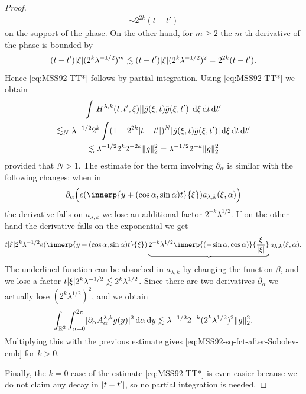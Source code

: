 \begin{proof}
\begin{multline*}
\sim
2^{2k} (t-t')
\end{multline*}
on the support of the phase.
On the other hand, for $m\geq 2$ the $m$-th derivative of the phase is bounded by
\[
(t-t') \lvert\xi\rvert (2^{k}\lambda^{-1/2})^{m}
\lesssim
(t-t') \lvert\xi\rvert (2^{k}\lambda^{-1/2})^{2}
=
2^{2k} (t-t').
\]
Hence \eqref{eq:MSS92-TT*} follows by partial integration.
Using \eqref{eq:MSS92-TT*} we obtain
\begin{multline*}
\int \lvert H^{\lambda,k}(t,t',\xi)\rvert \lvert\tilde{g}(\xi,t) \tilde{g}(\xi,t')\rvert \mathop{}\!\mathrm{d} \xi \mathop{}\!\mathrm{d} t \mathop{}\!\mathrm{d} t'\\
\lesssim_{N}
\lambda^{-1/2}2^{k} \int (1+2^{2k}\lvert t-t'\rvert)^{N} \lvert\tilde{g}(\xi,t) \tilde{g}(\xi,t')\rvert \mathop{}\!\mathrm{d} \xi \mathop{}\!\mathrm{d} t \mathop{}\!\mathrm{d} t'\\
\lesssim
\lambda^{-1/2}2^{k} 2^{-2k} \lVert g\rVert_{2}^{2}
=
\lambda^{-1/2}2^{-k} \lVert g\rVert_{2}^{2}
\end{multline*}
provided that $N>1$.
The estimate for the term involving $\partial_{\alpha}$ is similar with the following changes: when in
\[
\partial_{\alpha} \Bigl( e(\innerp{y+(\cos\alpha,\sin\alpha)t}{\xi}) a_{\lambda,k}(\xi,\alpha) \Bigr)
\]
the derivative falls on $a_{\lambda,k}$ we lose an additional factor $2^{-k}\lambda^{1/2}$.
If on the other hand the derivative falls on the exponential we get
\[
t \abs{\xi} 2^{k} \lambda^{-1/2} e(\innerp{y+(\cos\alpha,\sin\alpha)t}{\xi})
\underbrace{2^{-k}\lambda^{1/2 }\innerp{(-\sin\alpha,\cos\alpha)}{\frac{\xi}{\abs{\xi}}}}
a_{\lambda,k}(\xi,\alpha).
\]
The underlined function can be absorbed in $a_{\lambda,k}$ by changing the function $\beta$, and we lose a factor $t \lvert\xi\rvert 2^{k} \lambda^{-1/2} \lesssim 2^{k} \lambda^{1/2}$.
Since there are two derivatives $\partial_{\alpha}$ we actually lose $(2^{k}\lambda^{1/2})^{2}$, and we obtain
\[
\int_{\mathbb{R}^{2}} \int_{\alpha=0}^{2\pi} \lvert\partial_{\alpha} A_{\alpha}^{\lambda,k} g(y)\rvert^{2} \mathop{}\!\mathrm{d} \alpha \mathop{}\!\mathrm{d} y
\lesssim
\lambda^{-1/2}2^{-k} (2^{k}\lambda^{1/2})^{2} \lVert g\rVert_{2}^{2}.
\]
Multiplying this with the previous estimate gives \eqref{eq:MSS92-sq-fct-after-Sobolev-emb} for $k>0$.

Finally, the $k=0$ case of the estimate \eqref{eq:MSS92-TT*} is even easier because we do not claim any decay in $\lvert t-t'\rvert$, so no partial integration is needed.
\end{proof}

